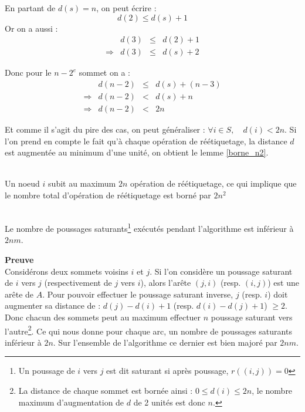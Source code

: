 En partant de $d(s) = n$, on peut écrire : $$
d(2) \leq d(s) + 1 $$ Or on a aussi : $$
\begin{array}{lrcl}
	&d(3) & \leq & d(2) + 1 \\
\Rightarrow & d(3) & \leq & d(s) + 2
\end{array} $$

Donc pour le $n-2^e$ sommet on a : $$
\begin{array}{lrcl}
	&d(n-2) &\leq& d(s) + (n - 3) \\
\Rightarrow & d(n-2) & < & d(s) + n \\
\Rightarrow & d(n-2) & < & 2n 
\end{array} $$

Et comme il s'agit du pire des cas, on peut généraliser : $\forall i \in S, \quad d(i) < 2n $.
Si l'on prend en compte le fait qu'à chaque opération de réétiquetage, la distance $d$ est augmentée
au minimum d'une unité, on obtient le lemme \ref{borne_n2}.

\begin{lemma}~\\
	\label{borne_n2}
	Un noeud $i$ subit au maximum $2n$ opération de réétiquetage, ce qui implique que le nombre total
	d'opération de réétiquetage est borné par $2n^2$
\end{lemma}

\begin{lemma}~\\
	\label{borne_ps}
	Le nombre de poussages saturants\footnote{Un poussage de $i$ vers $j$ est dit saturant si après
	poussage, $r((i,j)) = 0$} exécutés pendant l'algorithme est inférieur à $2nm$.
\end{lemma}

\textbf{Preuve}\\
Considérons deux sommets voisins $i$ et $j$. Si l'on considère un poussage saturant de $i$ vers
$j$ (respectivement de $j$ vers $i$), alors l'arête $(j, i)$ (resp. $(i,j)$) est une arête de $A$.
Pour pouvoir effectuer le poussage saturant inverse, $j$ (resp. $i$) doit augmenter sa distance de
: $d(j) - d(i) + 1$ (resp. $d(i) - d(j) + 1$) $\geq 2$. Donc chacun des sommets peut au maximum
effectuer $n$ poussage saturant vers l'autre\footnote{La distance de chaque sommet est bornée
ainsi : $0 \leq d(i) \leq 2n$, le nombre maximum d'augmentation de $d$ de 2 unités est donc $n$.}.
Ce qui nous donne pour chaque arc, un nombre de poussages saturants inférieur à $2n$. Sur
l'ensemble de l'algorithme ce dernier est bien majoré par $2nm$.

